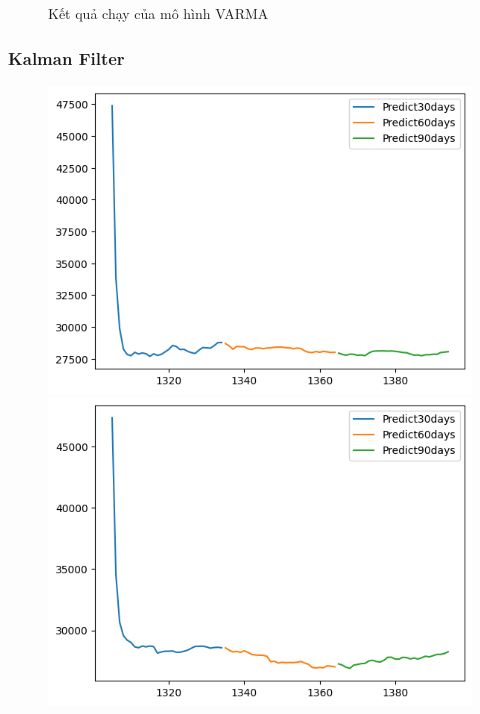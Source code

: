 \begin{figure}[H]
\begin{minipage}{0.15\textwidth}
    \end{minipage}
    \hfill
    
    \caption{Kết quả chạy của mô hình VARMA}
    \label{fig:varma_predicted}
\end{figure}




\subsubsection{Kalman Filter}
\begin{figure}[H]
    \centering
    \begin{minipage}{0.15\textwidth}
    \centering
    \includegraphics[width=1\textwidth]{resources/chapter-5/newdata1/predicted/KF_BIDV_7_3_30days.png}
    \end{minipage}
    \hfill
    \begin{minipage}{0.15\textwidth}
    \centering
    \includegraphics[width=1\textwidth]{resources/chapter-5/newdata1/predicted/KF_BIDV_8_2_30days.png}

\end{minipage}
\end{figure}
